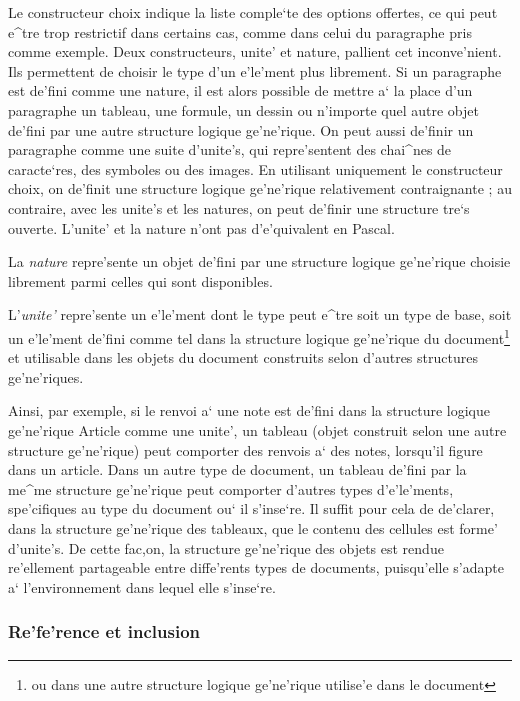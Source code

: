 Le constructeur choix indique la liste comple`te des options offertes,
ce qui peut e^tre trop restrictif dans certains cas,
comme dans celui du paragraphe pris comme exemple. Deux constructeurs,
unite' et nature, pallient cet inconve'nient. Ils permettent de
choisir le type d'un e'le'ment plus librement. Si un paragraphe est de'fini
comme une nature, il est alors possible de mettre a` la place d'un paragraphe
un tableau, une formule, un dessin ou n'importe quel autre objet de'fini par
une autre structure logique ge'ne'rique. On peut aussi de'finir un paragraphe
comme une suite d'unite's, qui repre'sentent des chai^nes de caracte`res,
des symboles ou des images. En utilisant uniquement le constructeur choix,
on de'finit une structure logique ge'ne'rique relativement contraignante ;
au contraire, avec les unite's et les natures, on peut de'finir une structure
tre`s ouverte. L'unite' et la nature n'ont pas d'e'quivalent en Pascal.

La {\em nature} repre'sente un objet de'fini par une structure logique
ge'ne'rique choisie librement parmi celles qui sont disponibles.

L'{\em unite'} repre'sente un e'le'ment dont le type peut e^tre soit un type
de base, soit un e'le'ment de'fini comme tel dans la structure logique ge'ne'rique du
document\footnote{ou dans une autre structure logique ge'ne'rique utilise'e
dans le document} et utilisable dans les objets du document construits selon
d'autres structures ge'ne'riques.

Ainsi, par exemple, si le renvoi a` une note est de'fini dans la structure
logique ge'ne'rique Article comme une unite', un tableau (objet construit
selon une autre structure ge'ne'rique) peut comporter des renvois a`
des notes, lorsqu'il figure dans un article. Dans un autre type de
document, un tableau de'fini par la me^me structure ge'ne'rique peut comporter
d'autres types d'e'le'ments, spe'cifiques au type du document ou` il
s'inse`re. Il suffit pour cela de de'clarer, dans la structure ge'ne'rique
des tableaux, que le contenu des cellules est forme' d'unite's. De cette
fac,on, la structure ge'ne'rique des objets est rendue re'ellement
partageable entre diffe'rents types de documents, puisqu'elle s'adapte a`
l'environnement dans lequel elle s'inse`re.

\subsubsection{Re'fe'rence et inclusion}

